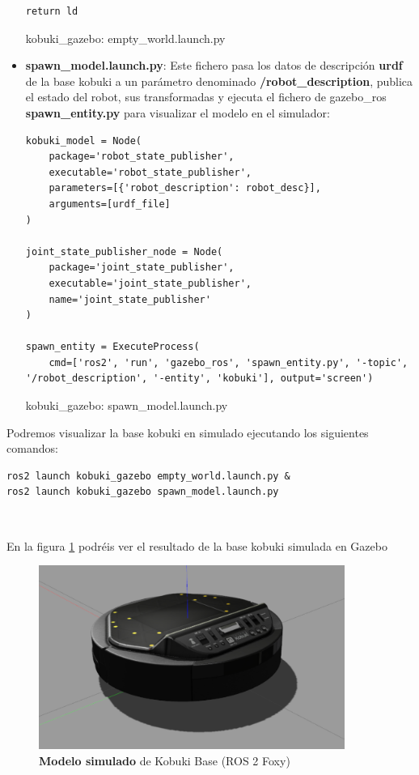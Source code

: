 \begin{itemize}
\begin{code}[H]
\begin{lstlisting}[frame=single]
	return ld
\end{lstlisting}
\caption[kobuki\_gazebo: empty\_world.launch.py]{kobuki\_gazebo: empty\_world.launch.py}
\label{cod:kobuki_gazebo_empty_world}
\end{code}

	\item \textbf{spawn\_model.launch.py}: Este fichero pasa los datos de descripción \textbf{urdf} de la base kobuki a un parámetro denominado \textbf{/robot\_description}, publica el estado del robot, sus transformadas y ejecuta el fichero de gazebo\_ros \textbf{spawn\_entity.py} para visualizar el modelo en el simulador:
	
\begin{code}[H]
\begin{lstlisting}[frame=single]
kobuki_model = Node(
	package='robot_state_publisher',
	executable='robot_state_publisher',
	parameters=[{'robot_description': robot_desc}],
	arguments=[urdf_file]
)

joint_state_publisher_node = Node(
	package='joint_state_publisher',
	executable='joint_state_publisher',
	name='joint_state_publisher'
)

spawn_entity = ExecuteProcess(
	cmd=['ros2', 'run', 'gazebo_ros', 'spawn_entity.py', '-topic', '/robot_description', '-entity', 'kobuki'], output='screen')
\end{lstlisting}
\caption[kobuki\_gazebo: spawn\_model.launch.py]{kobuki\_gazebo: spawn\_model.launch.py}
\label{cod:kobuki_gazebo_spawn_model}
\end{code}
\end{itemize}

Podremos visualizar la base kobuki en simulado ejecutando los siguientes comandos:\\
\begin{lstlisting}
ros2 launch kobuki_gazebo empty_world.launch.py &
ros2 launch kobuki_gazebo spawn_model.launch.py
\end{lstlisting}\

En la figura \ref{fig:sim_kobuki_base} podréis ver el resultado de la base kobuki simulada en Gazebo
\begin{figure} [H]
  \begin{center}
    \includegraphics[width=10cm]{imagenes/sim_kobuki_base.png}
  \end{center}
  \caption[\textbf{Modelo simulado} de Kobuki Base (ROS 2 Foxy)]{\textbf{Modelo simulado} de Kobuki Base (ROS 2 Foxy)}
  \label{fig:sim_kobuki_base}
\end{figure}\




